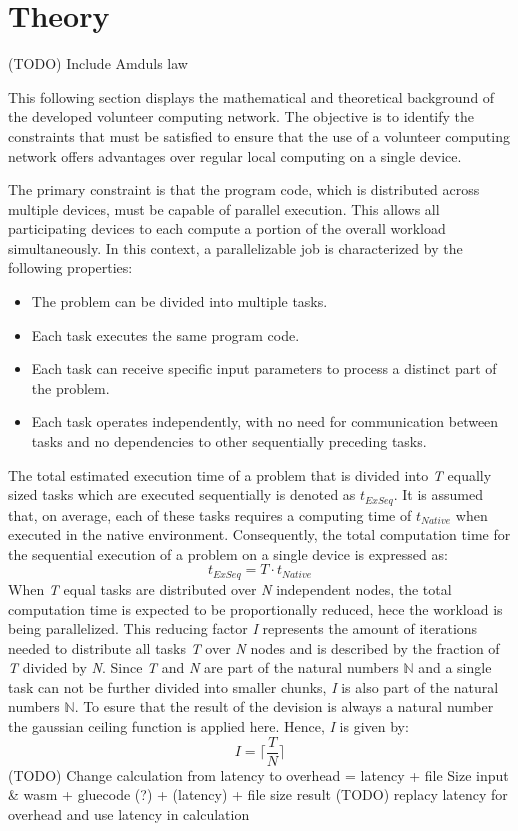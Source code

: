 \section{Theory}
\label{sec:concept:theory}
(TODO) Include Amduls law 

This following section displays the mathematical and theoretical background of the developed volunteer computing network. The objective is to identify the constraints that must be satisfied to ensure that the use of a volunteer computing network offers advantages over regular local computing on a single device.

The primary constraint is that the program code, which is distributed across multiple devices, must be capable of parallel execution. This allows all participating devices to each compute a portion of the overall workload simultaneously. In this context, a parallelizable job is characterized by the following properties:
\begin{itemize}
  \item The problem can be divided into multiple tasks.
  \item Each task executes the same program code.
  \item Each task can receive specific input parameters to process a distinct part of the problem.
  \item Each task operates independently, with no need for communication between tasks and no dependencies to other sequentially preceding tasks.
\end{itemize}
The total estimated execution time of a problem that is divided into \emph{T} equally sized tasks which are executed sequentially is denoted as $t_{ExSeq}$. It is assumed that, on average, each of these tasks requires a computing time of $t_{Native}$ when executed in the native environment. Consequently, the total computation time for the sequential execution of a problem on a single device is expressed as:
\begin{equation}
  t_{ExSeq} = T \cdot t_{Native}
  \label{equ:single}
\end{equation}
When \emph{T} equal tasks are distributed over \emph{N} independent nodes, the total computation time is expected to be proportionally reduced, hece the workload is being parallelized. This reducing factor \emph{I} represents the amount of iterations needed to distribute all tasks \emph{T} over \emph{N} nodes and is described by the fraction of \emph{T} divided by \emph{N}. Since \emph{T} and \emph{N} are part of the natural numbers $\mathbb{N}$ and a single task can not be further divided into smaller chunks, \emph{I} is also part of the natural numbers $\mathbb{N}$. To esure that the result of the devision is always a natural number the gaussian ceiling function is applied here. Hence, \emph{I} is given by: 
\begin{equation}
  I = \bigg\lceil\frac{T}{N}\bigg\rceil
  \label{equ:frac}
\end{equation}
(TODO) Change calculation from latency to overhead = latency + file Size input \& wasm + gluecode (?) + (latency) + file size result
(TODO) replacy latency for overhead and use latency in calculation

